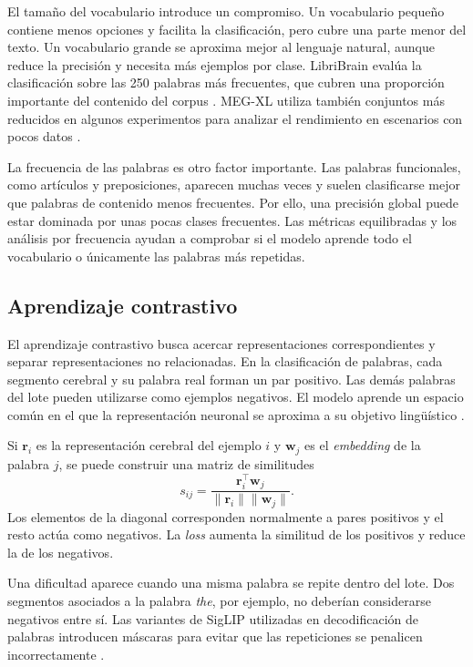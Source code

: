 El tamaño del vocabulario introduce un compromiso. Un vocabulario pequeño contiene menos opciones y facilita la clasificación, pero cubre una parte menor del texto. Un vocabulario grande se aproxima mejor al lenguaje natural, aunque reduce la precisión y necesita más ejemplos por clase. LibriBrain evalúa la clasificación sobre las 250 palabras más frecuentes, que cubren una proporción importante del contenido del corpus \cite{ozdogan2025libribrain}. MEG-XL utiliza también conjuntos más reducidos en algunos experimentos para analizar el rendimiento en escenarios con pocos datos \cite{jayalath2026megxl}.

La frecuencia de las palabras es otro factor importante. Las palabras funcionales, como artículos y preposiciones, aparecen muchas veces y suelen clasificarse mejor que palabras de contenido menos frecuentes. Por ello, una precisión global puede estar dominada por unas pocas clases frecuentes. Las métricas equilibradas y los análisis por frecuencia ayudan a comprobar si el modelo aprende todo el vocabulario o únicamente las palabras más repetidas.



\subsection{Aprendizaje contrastivo}

El aprendizaje contrastivo busca acercar representaciones correspondientes y separar representaciones no relacionadas. En la clasificación de palabras, cada segmento cerebral y su palabra real forman un par positivo. Las demás palabras del lote pueden utilizarse como ejemplos negativos. El modelo aprende un espacio común en el que la representación neuronal se aproxima a su objetivo lingüístico \cite{zhai2023siglip}.

Si \(\mathbf{r}_i\) es la representación cerebral del ejemplo \(i\) y \(\mathbf{w}_j\) es el \textit{embedding} de la palabra \(j\), se puede construir una matriz de similitudes
\[
    s_{ij} =
    \frac{\mathbf{r}_i^{\top}\mathbf{w}_j}
    {\lVert\mathbf{r}_i\rVert\lVert\mathbf{w}_j\rVert}.
\]
Los elementos de la diagonal corresponden normalmente a pares positivos y el resto actúa como negativos. La \textit{loss} aumenta la similitud de los positivos y reduce la de los negativos.

Una dificultad aparece cuando una misma palabra se repite dentro del lote. Dos segmentos asociados a la palabra \textit{the}, por ejemplo, no deberían considerarse negativos entre sí. Las variantes de SigLIP utilizadas en decodificación de palabras introducen máscaras para evitar que las repeticiones se penalicen incorrectamente \cite{zhai2023siglip,dascoli2025words}.

